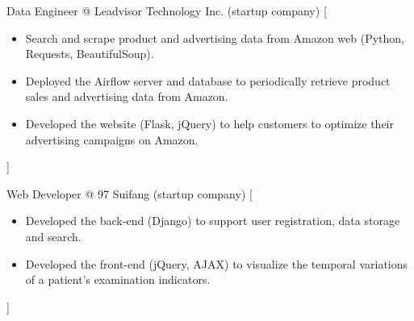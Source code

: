 \documentclass{resume}
\begin{document}
\begin{experiences}
    {Data Engineer @ Leadvisor Technology Inc. (startup company)}%
    [\begin{itemize}
      \item Search and scrape product and advertising data from Amazon web
        (Python, Requests, BeautifulSoup).
      \item Deployed the Airflow server and database to periodically
        retrieve product sales and advertising data from Amazon.
      \item Developed the website (Flask, jQuery) to help customers to
        optimize their advertising campaigns on Amazon.
    \end{itemize}]

  \separator{0.5ex}
    {Web Developer @ 97 Suifang (startup company)}%
    [\begin{itemize}
      \item Developed the back-end (Django) to support user registration,
        data storage and search.
      \item Developed the front-end (jQuery, AJAX) to visualize the
        temporal variations of a patient's examination indicators.
    \end{itemize}]
\end{experiences}
\end{document}
